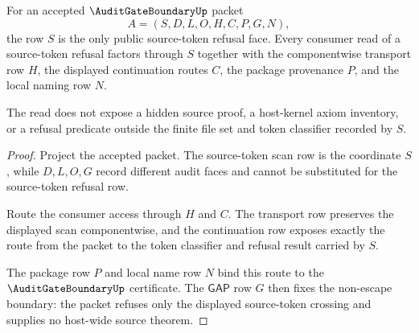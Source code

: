 \begin{theorem}
\label{thm:audit-gate-boundary-source-token-refusal}
For an accepted $\AuditGateBoundaryUp$ packet
$$
A=(S,D,L,O,H,C,P,G,N),
$$
the row $S$ is the only public source-token refusal face. Every consumer read of a source-token refusal factors through $S$ together with the componentwise transport row $H$, the displayed continuation routes $C$, the package provenance $P$, and the local naming row $N$.

The read does not expose a hidden source proof, a host-kernel axiom inventory, or a refusal predicate outside the finite file set and token classifier recorded by $S$.
\end{theorem}
\begin{proof}
Project the accepted packet. The source-token scan row is the coordinate $S$, while $D,L,O,G$ record different audit faces and cannot be substituted for the source-token refusal row.

Route the consumer access through $H$ and $C$. The transport row preserves the displayed scan componentwise, and the continuation row exposes exactly the route from the packet to the token classifier and refusal result carried by $S$.

The package row $P$ and local name row $N$ bind this route to the $\AuditGateBoundaryUp$ certificate. The $\mathsf{GAP}$ row $G$ then fixes the non-escape boundary: the packet refuses only the displayed source-token crossing and supplies no host-wide source theorem.
\end{proof}

